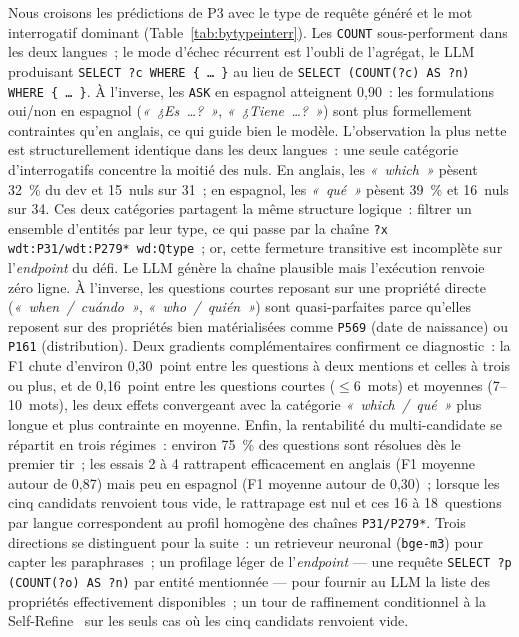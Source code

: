 \documentclass[]{ceurart}
\begin{document}
Nous croisons les prédictions de P3 avec le type de requête généré et le mot interrogatif dominant (Table~\ref{tab:bytypeinterr}). Les \texttt{COUNT} sous-performent dans les deux langues~; le mode d'échec récurrent est l'oubli de l'agrégat, le LLM produisant \texttt{SELECT ?c WHERE \{~\dots~\}} au lieu de \texttt{SELECT (COUNT(?c) AS ?n) WHERE \{~\dots~\}}. À l'inverse, les \texttt{ASK} en espagnol atteignent 0{,}90~: les formulations oui/non en espagnol (\emph{«~¿Es~\ldots ?~»}, \emph{«~¿Tiene~\ldots ?~»}) sont plus formellement contraintes qu'en anglais, ce qui guide bien le modèle. L'observation la plus nette est structurellement identique dans les deux langues~: une seule catégorie d'interrogatifs concentre la moitié des nuls. En anglais, les \emph{«~which~»} pèsent 32~\% du dev et 15~nuls sur 31~; en espagnol, les \emph{«~qué~»} pèsent 39~\% et 16~nuls sur 34. Ces deux catégories partagent la même structure logique~: filtrer un ensemble d'entités par leur type, ce qui passe par la chaîne \texttt{?x wdt:P31/wdt:P279* wd:Qtype}~; or, cette fermeture transitive est incomplète sur l'\emph{endpoint} du défi. Le LLM génère la chaîne plausible mais l'exécution renvoie zéro ligne. À l'inverse, les questions courtes reposant sur une propriété directe (\emph{«~when~/~cuándo~»}, \emph{«~who~/~quién~»}) sont quasi-parfaites parce qu'elles reposent sur des propriétés bien matérialisées comme \texttt{P569} (date de naissance) ou \texttt{P161} (distribution). Deux gradients complémentaires confirment ce diagnostic~: la F1 chute d'environ 0{,}30~point entre les questions à deux mentions et celles à trois ou plus, et de 0{,}16~point entre les questions courtes ($\leq 6$~mots) et moyennes (7--10~mots), les deux effets convergeant avec la catégorie \emph{«~which~/~qué~»} plus longue et plus contrainte en moyenne. Enfin, la rentabilité du multi-candidate se répartit en trois régimes~: environ 75~\% des questions sont résolues dès le premier tir~; les essais 2 à 4 rattrapent efficacement en anglais (F1 moyenne autour de 0{,}87) mais peu en espagnol (F1 moyenne autour de 0{,}30)~; lorsque les cinq candidats renvoient tous vide, le rattrapage est nul et ces 16 à 18~questions par langue correspondent au profil homogène des chaînes \texttt{P31/P279*}. Trois directions se distinguent pour la suite~: un retrieveur neuronal (\texttt{bge-m3}) pour capter les paraphrases~; un profilage léger de l'\emph{endpoint} — une requête \texttt{SELECT ?p (COUNT(?o) AS ?n)} par entité mentionnée — pour fournir au LLM la liste des propriétés effectivement disponibles~; un tour de raffinement conditionnel à la Self-Refine~\cite{madaan2023selfrefine} sur les seuls cas où les cinq candidats renvoient vide.
\end{document}

